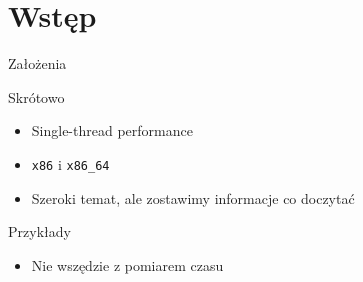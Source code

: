 \section{Wstęp} %
\begin{frame}{Założenia}
	\begin{block}{Skrótowo}
		\begin{itemize}
			\item Single-thread performance
			\item \texttt{x86} i \texttt{x86\_64}
			\item Szeroki temat, ale zostawimy informacje co doczytać
		\end{itemize}
	\end{block}
	\begin{block}{Przykłady}
		\begin{itemize}
			\item Nie wszędzie z pomiarem czasu
		\end{itemize}
	\end{block}
\end{frame}

